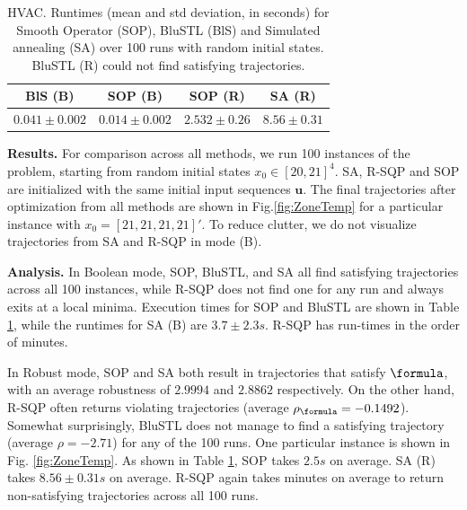 \begin{table}[tb]
\small
\begin{center}
\caption{{\small HVAC. Runtimes (mean and std deviation, in seconds) for Smooth Operator (SOP), BluSTL (BlS) and Simulated annealing (SA) over 100 runs with random initial states. BluSTL (R) could not find satisfying trajectories.}}
\vspace{-5pt}
\label{tbl:time_performance_bldg}
\begin{tabular} {|c|c|c|c|}
	\hline
	BlS (B) & SOP (B) & SOP (R) & SA (R) \\ \hline
	 $0.041 \pm 0.002$ &  $\mathbf{0.014 \pm 0.002}$  &  $2.532 \pm 0.26$ & $8.56 \pm 0.31$ \\ \hline 
\end{tabular}	
\end{center}
\vspace{-10pt}
\end{table}



\textbf{Results.} For comparison across all methods, we run 100 instances of the problem, starting from random initial states $x_0 \in [20,21]^4$. SA, R-SQP and SOP are initialized with the same initial input sequences $\mathbf{u}$. 
The final trajectories after optimization from all methods are shown in Fig.\ref{fig:ZoneTemp} for a particular instance with $x_0 = [21,21,21,21]'$. To reduce clutter, we do not visualize trajectories from SA and R-SQP in mode (B).

\textbf{Analysis.} 
In Boolean mode, SOP, BluSTL, and SA all find satisfying trajectories across all 100 instances, while R-SQP does not find one for any run and always exits at a local minima. 
Execution times for SOP and BluSTL are shown in Table \ref{tbl:time_performance_bldg}, while the runtimes for SA (B) are $3.7 \pm 2.3s$.
 R-SQP has run-times in the order of minutes. 
 
In Robust mode, SOP and SA both result in trajectories that satisfy $\formula$, with an average robustness of $2.9994$ and $2.8862$ respectively. On the other hand, R-SQP often returns violating trajectories (average $\rob_{\formula} = -0.1492$). 
Somewhat surprisingly, BluSTL does not manage to find a satisfying trajectory (average $\rho=-2.71$) for any of the 100 runs. 
One particular instance is shown in Fig. \ref{fig:ZoneTemp}. 
As shown in Table \ref{tbl:time_performance_bldg}, SOP takes $2.5s$ on average.
SA (R) takes $8.56 \pm 0.31s$ on average. 
R-SQP again takes minutes on average to return non-satisfying trajectories across all 100 runs. 


